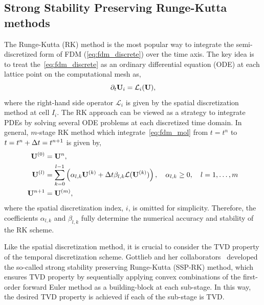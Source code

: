 \subsection{Strong Stability Preserving Runge-Kutta methods}\label{subsec:ssprk}

The Runge-Kutta (RK) method is the most popular way to integrate
the semi-discretized form of FDM (\cref{eq:fdm_discrete}) over the time axis.
The key idea is to treat the~\cref{eq:fdm_discrete} as an ordinary differential equation (ODE)
at each lattice point on the computational mesh as,
\begin{equation}\label{eq:fdm_mol}
    \pd{\bU_{i}}{t} = \mathcal{L}_{i} (\bU),
\end{equation}
where the right-hand side operator \( \mathcal{L}_{i} \) is given by the spatial discretization method at cell \( I_{i} \).
The RK approach can be viewed as a strategy to integrate PDEs by solving several ODE problems at each discretized time domain.
In general, \( m \)-stage RK method which integrate~\cref{eq:fdm_mol}
from \( t = t^{n} \) to \( t = t^{n} + \dt = t^{n + 1} \) is given by,
\begin{equation}\label{eq:general_rk}
    \begin{split}
        \bU^{(0)} &= \bU^{n}, \\
        \bU^{(l)} &= \sum_{k=0}^{l -1} \left( \alpha_{l, k} \bU^{(k)} + \dt \beta_{l,k} \mathcal{L} (\bU^{(k)}) \right), \quad \alpha_{l,k} \geq 0, \quad l = 1, \dots, m \\
        \bU^{n + 1} &= \bU^{(m)},
    \end{split}
\end{equation}
where the spatial discretization index, \( i \), is omitted for simplicity.
Therefore, the coefficients \( \alpha_{l,k} \) and \( \beta_{l,k} \) fully determine
the numerical accuracy and stability of the RK scheme.

Like the spatial discretization method, it is crucial to consider the TVD property of the temporal discretization scheme.
Gottlieb and her collaborators~\cite{gottlieb1998total,gottlieb2001strong,gottlieb2011strong}
developed the so-called strong stability preserving Runge-Kutta (SSP-RK) method,
which ensures TVD property by sequentially applying convex combinations of the
first-order forward Euler method as a building-block at each sub-stage.
In this way, the desired TVD property is achieved if each of the sub-stage is TVD\@.

